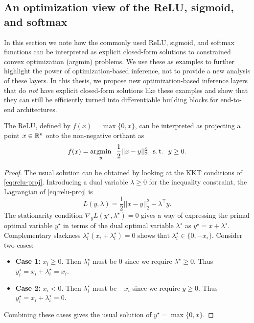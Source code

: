 \subsection{An optimization view of the ReLU, sigmoid, and softmax}
\label{sec:bg:existing}
In this section we note how the commonly used ReLU, sigmoid, and softmax
functions can be interpreted as explicit closed-form solutions
to constrained convex optimization (argmin) problems.
We use these as examples to further highlight the power of
optimization-based inference, not to provide a new analysis
of these layers.
In this thesis, we propose new optimization-based inference
layers that do \emph{not} have explicit closed-form solutions
like these examples and show that they can still be efficiently
turned into differentiable building blocks for end-to-end architectures.

\begin{theorem}
  The ReLU, defined by $f(x) = \max\{0, x\}$,
  can be interpreted as projecting a point $x\in\mathbb{R}^n$ onto
  the non-negative orthant as
  \begin{equation}
    f(x) = \operatorname*{argmin}_y \;\; \frac{1}{2}||x-y||_2^2 \;\; \operatorname*{s.t.} \;\; y\geq 0.
    \label{eq:relu-proj}
  \end{equation}
\end{theorem}

\begin{proof}
  The usual solution can be obtained by looking at
  the KKT conditions of \cref{eq:relu-proj}.
  Introducing a dual variable $\lambda\geq 0$ for the inequality
  constraint, the Lagrangian of \cref{eq:relu-proj} is
  \begin{equation}
    L(y, \lambda)=\frac{1}{2}||x-y||_2^2 - \lambda^\top y.
  \end{equation}
  The stationarity condition
  $\nabla_y L(y^\star, \lambda^\star) = 0$
  gives a way of expressing the primal optimal
  variable $y^\star$ in terms of the dual optimal
  variable $\lambda^\star$ as $y^\star=x+\lambda^\star$.
  Complementary slackness $\lambda^\star_i(x_i+\lambda^\star_i)=0$
  shows that $\lambda^\star_i\in\{0, -x_i\}$.
  Consider two cases:
  \begin{itemize}
  \item \textbf{Case 1:} $x_i\geq 0$.
    Then $\lambda^\star_i$ must be 0
    since we require $\lambda^\star\geq 0$.
    Thus $y^\star_i=x_i+\lambda^\star_i=x_i$.
  \item \textbf{Case 2:} $x_i< 0$.
    Then $\lambda^\star_i$ must be $-x_i$
    since we require $y\geq 0$.
    Thus $y^\star_i=x_i+\lambda^\star_i=0$.
  \end{itemize}
  Combining these cases gives the usual solution of
  $y^\star=\max\{0, x\}$.
\end{proof}

